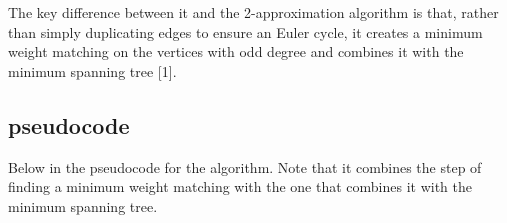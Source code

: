 \documentclass{article}
\begin{document}
The key difference between it and the 2-approximation
algorithm is that, rather than simply duplicating edges to ensure an Euler
cycle, it creates a minimum weight matching on the vertices with odd degree and
combines it with the minimum spanning tree [1].

\subsection{pseudocode}
Below in the pseudocode for the algorithm. Note that it combines the step of
finding a minimum weight matching with the one that combines it with the minimum
spanning tree.

\FloatBarrier

\end{document}
